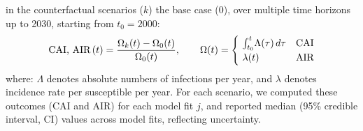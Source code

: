 in the counterfactual scenarios ($k$) \vs the base case ($0$),
over multiple time horizons up to 2030, starting from $t_0 = 2000$:
\begin{equation}
  \textnormal{CAI, AIR}\,(t) = \frac{\Omega_{k}(t) - \Omega_{0}(t)}{\Omega_{0}(t)}
  ,\qquad \Omega(t) =
  \begin{cases}
    ~\int_{t_0}^{t}\!\Lambda(\tau)\,d\tau & \textnormal{CAI} \\
    ~\lambda(t) & \textnormal{AIR}
  \end{cases}
\end{equation} where:
$\Lambda$ denotes absolute numbers of infections per year, and
$\lambda$ denotes incidence rate per susceptible per year.
For each scenario, we computed these outcomes (CAI and AIR) for each model fit $j$,
and reported median (95\% credible interval, CI) values across model fits, reflecting uncertainty.
